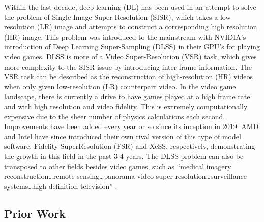 \documentclass{article}
\begin{document}
 Within the last decade, deep learning (DL) has been used in an attempt to solve the problem of Single Image Super-Resolution (SISR), which takes a low resolution (LR) image and attempts to construct a corresponding high resolution (HR) image. This problem was introduced to the mainstream with NVIDIA’s introduction of Deep Learning Super-Sampling (DLSS) in their GPU’s for playing video games. DLSS is more of a Video Super-Resolution (VSR) task, which gives more complexity to the SISR issue by introducing inter-frame information. The VSR task can be described as the reconstruction of high-resolution (HR) videos when only given low-resolution (LR) counterpart video. In the video game landscape, there is currently a drive to have games played at a high frame rate and with high resolution and video fidelity. This is extremely computationally expensive due to the sheer number of physics calculations each second. Improvements have been added every year or so since its inception in 2019. AMD and Intel have since introduced their own rival version of this type of model software, Fidelity SuperResolution (FSR) and XeSS, respectively, demonstrating the growth in this field in the past 3-4 years. The DLSS problem can also be transposed to other fields besides video games, such as “medical imagery reconstruction…remote sensing…panorama video super-resolution…surveillance systems…high-definition television” \cite{liu_video_2022}. 

\subsection{Prior Work}
 
\end{document}

